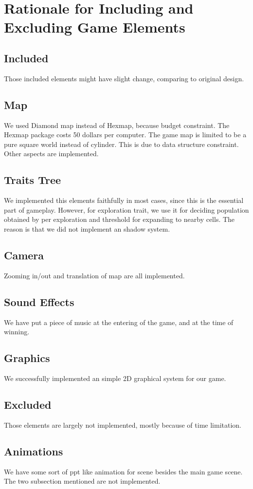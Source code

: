 \section{Rationale for Including and Excluding Game Elements}

\subsection{Included}
Those included elements might have slight change, comparing to original design.
	\subsection{Map}
	We used Diamond map instead of Hexmap, because budget constraint. The Hexmap package costs 50 dollars per computer. The game map is limited to be a pure square world instead of cylinder. This is due to data structure constraint. Other aspects are implemented.
	\subsection{Traits Tree}
	We implemented this elements faithfully in most cases, since this is the essential part of gameplay. However, for exploration trait, we use it for deciding population obtained by per exploration and threshold for expanding to nearby cells. The reason is that we did not implement an shadow system.
	\subsection{Camera}
	Zooming in/out and translation of map are all implemented.

	\subsection{Sound Effects}
	We have put a piece of music at the entering of the game, and at the time of winning.
\subsection{Graphics}
We successfully implemented an simple 2D graphical system for our game.

\subsection{Excluded}
Those elements are largely not implemented, mostly because of time limitation.
\subsection{Animations}
We have some sort of ppt like animation for scene besides the main game scene. The two subsection mentioned are not implemented.
